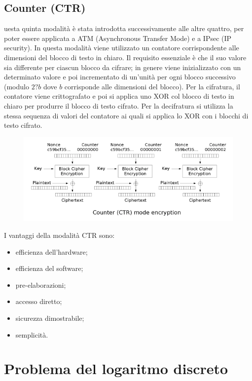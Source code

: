 \documentclass[10pt,a4paper]{article}
\begin{document}
\subsection{Counter (CTR)}
uesta quinta modalità è stata introdotta successivamente alle altre quattro, per poter essere applicata a ATM (Asynchronous Transfer Mode) e a IPsec (IP security).
In questa modalità viene utilizzato un contatore corrispondente alle dimensioni del blocco di testo in chiaro. Il requisito essenziale è che il suo valore sia differente per ciascun blocco da cifrare; in genere viene inizializzato con un determinato valore e poi incrementato di un'unità per ogni blocco successivo (modulo $2?b$ dove $b$ corrisponde alle dimensioni del blocco).
Per la cifratura, il contatore viene crittografato e poi si applica uno XOR col blocco di testo in chiaro per produrre il blocco di testo cifrato.
Per la decifratura si utilizza la stessa sequenza di valori del contatore ai quali si applica lo XOR con i blocchi di testo cifrato.

\begin{figure}[htbp]
\includegraphics[scale=0.8]{immagini/ctr.png}
\end{figure}

I vantaggi della modalità CTR sono:
\begin{itemize}
\item efficienza dell'hardware;
\item efficienza del software;
\item pre-elaborazioni;
\item accesso diretto;
\item sicurezza dimostrabile;
\item semplicità.
\end{itemize}
    
\section{Problema del logaritmo discreto}

\end{document}
